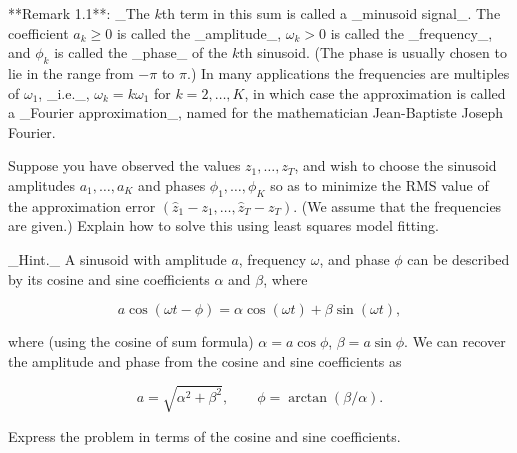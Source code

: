 

**Remark 1.1**: _The \(k\)th term in this sum is called a _minusoid signal_. The coefficient \(a_{k}\geq 0\) is called the _amplitude_, \(\omega_{k}>0\) is called the _frequency_, and \(\phi_{k}\) is called the _phase_ of the \(k\)th sinusoid. (The phase is usually chosen to lie in the range from \(-\pi\) to \(\pi\).) In many applications the frequencies are multiples of \(\omega_{1}\), _i.e._, \(\omega_{k}=k\omega_{1}\) for \(k=2,\ldots,K\), in which case the approximation is called a _Fourier approximation_, named for the mathematician Jean-Baptiste Joseph Fourier.

Suppose you have observed the values \(z_{1},\ldots,z_{T}\), and wish to choose the sinusoid amplitudes \(a_{1},\ldots,a_{K}\) and phases \(\phi_{1},\ldots,\phi_{K}\) so as to minimize the RMS value of the approximation error \((\hat{z}_{1}-z_{1},\ldots,\hat{z}_{T}-z_{T})\). (We assume that the frequencies are given.) Explain how to solve this using least squares model fitting.

_Hint._ A sinusoid with amplitude \(a\), frequency \(\omega\), and phase \(\phi\) can be described by its cosine and sine coefficients \(\alpha\) and \(\beta\), where

\[a\cos(\omega t-\phi)=\alpha\cos(\omega t)+\beta\sin(\omega t),\]

where (using the cosine of sum formula) \(\alpha=a\cos\phi\), \(\beta=a\sin\phi\). We can recover the amplitude and phase from the cosine and sine coefficients as

\[a=\sqrt{\alpha^{2}+\beta^{2}},\qquad\phi=\arctan(\beta/\alpha).\]

Express the problem in terms of the cosine and sine coefficients.

